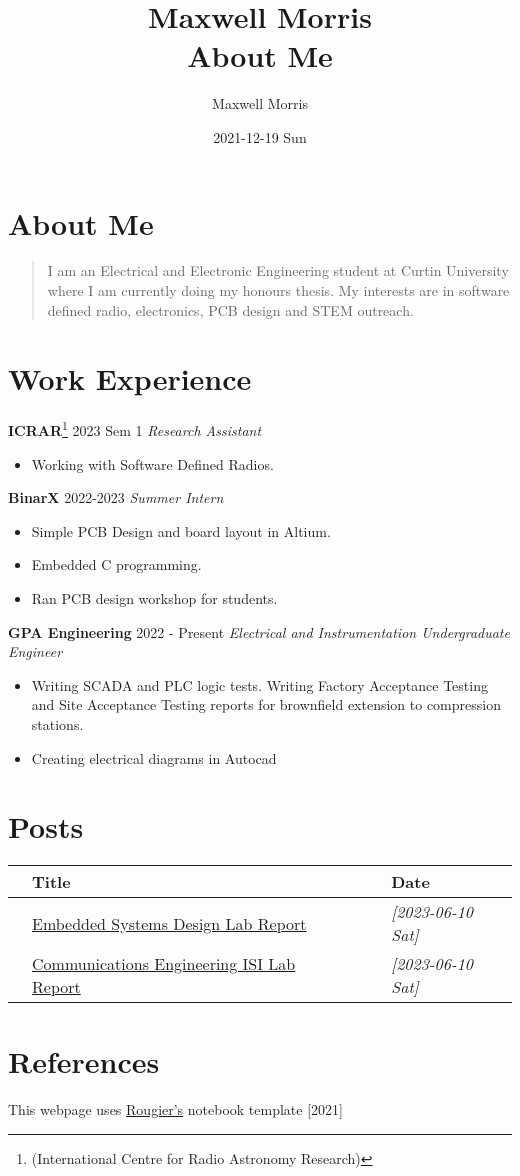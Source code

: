 \documentclass[11pt]{article}
\author{Maxwell Morris}
\date{2021-12-19 Sun}
\title{Maxwell Morris\\\medskip
\large About Me}
\begin{document}
\maketitle
\section*{About Me}
\label{sec:orgde23764}

\begin{quote}
I am an Electrical and Electronic Engineering student at Curtin University where I am currently doing my honours thesis. My interests are in software defined radio, electronics, PCB design and STEM outreach.
\end{quote}

\section*{Work Experience}
\label{sec:org2ddc912}
\textbf{ICRAR}\footnote{(International Centre for Radio Astronomy Research)} 2023 Sem 1 \emph{Research Assistant}
\begin{itemize}
\item Working with Software Defined Radios.
\end{itemize}
\textbf{BinarX} 2022-2023 \emph{Summer Intern}
\begin{itemize}
\item Simple PCB Design and board layout in Altium.
\item Embedded C programming.
\item Ran PCB design workshop for students.
\end{itemize}
\textbf{GPA Engineering} 2022 - Present \emph{Electrical and Instrumentation Undergraduate Engineer}
\begin{itemize}
\item Writing SCADA and PLC logic tests. Writing Factory Acceptance Testing and Site Acceptance Testing reports for brownfield extension to compression stations.
\item Creating electrical diagrams in Autocad
\end{itemize}

\section*{Posts}
\label{sec:org5adb0f4}
\begin{center}
\begin{tabular}{lllll}
 & Title &  &  & Date\\
\hline
 & \href{Posts/EmbeddedReport.pdf}{Embedded Systems Design Lab Report} &  &  & \textit{[2023-06-10 Sat]}\\
 & \href{Posts/MaxwellMorris\_ISI\_Lab.pdf}{Communications Engineering ISI Lab Report} &  &  & \textit{[2023-06-10 Sat]}\\
\end{tabular}
\end{center}


\section*{References}
\label{sec:orge89f043}
This webpage uses \href{https://github.com/rougier/notebook-mode}{Rougier's} notebook template [2021]
\end{document}
